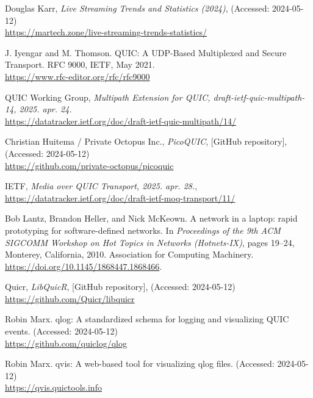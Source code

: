 \documentclass[a4paper,oneside]{article}
\begin{document}
\begin{thebibliography}{9}
\label{sec:tanulm-irod-jegyz}

 Douglas Karr, \emph{Live Streaming Trends and Statistics (2024)}, (Accessed: 2024-05-12)\\ 
\url{https://martech.zone/live-streaming-trends-statistics/}

 J. Iyengar and M. Thomson.
\newblock QUIC: A UDP-Based Multiplexed and Secure Transport.
\newblock RFC 9000, IETF, May 2021.\\
\url{https://www.rfc-editor.org/rfc/rfc9000}

 QUIC Working Group, \emph{Multipath Extension for QUIC, draft-ietf-quic-multipath-14, 2025. apr. 24.}\\
\url{https://datatracker.ietf.org/doc/draft-ietf-quic-multipath/14/}

 Christian Huitema / Private Octopus Inc., \emph{PicoQUIC}, [GitHub repository], (Accessed: 2024-05-12)\\
 \url{https://github.com/private-octopus/picoquic}

 IETF, \emph{Media over QUIC Transport, 2025. apr. 28.}, \url{https://datatracker.ietf.org/doc/draft-ietf-moq-transport/11/}

Bob Lantz, Brandon Heller, and Nick McKeown.
\newblock A network in a laptop: rapid prototyping for software-defined networks.
\newblock In \emph{Proceedings of the 9th ACM SIGCOMM Workshop on Hot Topics in Networks (Hotnets-IX)}, pages 19--24, Monterey, California, 2010.
\newblock Association for Computing Machinery. \url{https://doi.org/10.1145/1868447.1868466}.

 Quicr, \emph{LibQuicR}, [GitHub repository], (Accessed: 2024-05-12)\\
 \url{https://github.com/Quicr/libquicr}

Robin Marx.
\newblock qlog: A standardized schema for logging and visualizing QUIC events. (Accessed: 2024-05-12)\\
\url{https://github.com/quiclog/qlog}

Robin Marx.
\newblock qvis: A web-based tool for visualizing qlog files. (Accessed: 2024-05-12)\\
\url{https://qvis.quictools.info}

\end{thebibliography}

\end{document}
